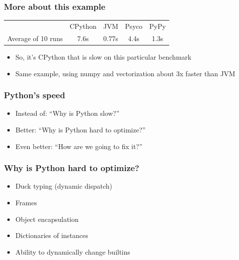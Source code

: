 \documentclass[utf8x]{beamer}
\begin{document}
\begin{frame}
  \frametitle{More about this example}
  \begin{tabular}{| l | c | c | c | c |}
    \hline
    & CPython & JVM & Psyco & PyPy \\
    Average of 10 runs & 7.6s & 0.77s & 4.4s & 1.3s \\
    \hline
  \end{tabular}
  \vspace{.5cm}
  \pause
  \begin{itemize}
    \item So, it's CPython that is slow on this particular benchmark
      \pause
    \item Same example, using numpy and vectorization about 3x faster than JVM
  \end{itemize}
\end{frame}

\begin{frame}
  \frametitle{Python's speed}
  \begin{itemize}
    \item Instead of: ``Why is Python slow?''
      \pause
    \item Better: ``Why is Python hard to optimize?''
      \pause
    \item Even better: ``How are we going to fix it?''
  \end{itemize}
\end{frame}

\begin{frame}
  \frametitle{Why is Python hard to optimize?}
  \begin{itemize}
    \item Duck typing (dynamic dispatch)
    \item Frames
    \item Object encapsulation
    \item Dictionaries of instances
    \item Ability to dynamically change builtins
  \end{itemize}
\end{frame}

\begin{frame}
\end{frame}
\end{document}
